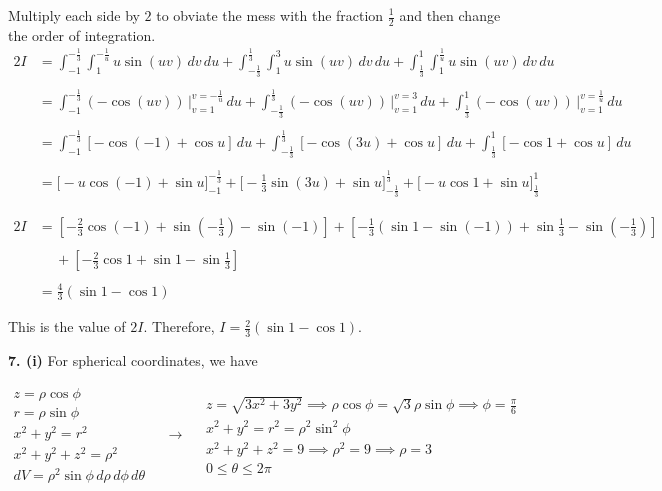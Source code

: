 \documentclass{article}
\begin{document}
Multiply each side by $2$ to obviate the mess with the fraction $\displaystyle\frac12$ and then change the order of integration.
\begin{align*}
2{I}&=\int_{-1}^{\textstyle-\frac13}\int_1^{\textstyle-\frac1u}u\sin(uv)\,dv\,du+\int_{\textstyle-\frac13}^{\textstyle\frac13}\int_1^3u\sin(uv)\,dv\,du+\int_{\textstyle\frac13}^1\int_1^{\textstyle\frac1u}u\sin(uv)\,dv\,du\\\\&=\int_{-1}^{\textstyle-\frac13}(-\cos(uv))\,\bigg|_{v=1}^{v=-\frac1u}\,du+\int_{\textstyle-\frac13}^{\textstyle\frac13}(-\cos(uv))\,\bigg|_{v=1}^{v=3}\,du+\int_{\textstyle\frac13}^1(-\cos(uv))\,\bigg|_{v=1}^{v=\frac1u}\,du\\\\&=\int_{-1}^{\textstyle-\frac13}[-\cos(-1)+\cos u]\,du+\int_{\textstyle-\frac13}^{\textstyle\frac13}[-\cos(3u)+\cos u]\,du+\int_{\textstyle\frac13}^1[-\cos1+\cos u]\,du\\\\&=\bigg[-u\cos(-1)+\sin u\bigg]_{-1}^{\textstyle-\frac13}+\bigg[-\frac13\sin(3u)+\sin u\bigg]_{\textstyle-\frac13}^{\textstyle\frac13}+\bigg[-u\cos1+\sin u\bigg]_{\textstyle\frac13}^1
\end{align*}

\begin{align*}
2{I}&=\left[-\frac23\cos(-1)+\sin\left(-\frac13\right)-\sin(-1)\right]+\left[-\frac13\left(\sin1-\sin(-1)\right)+\sin\frac13-\sin\left(-\frac13\right)\right]\\\\&\quad\:+\left[-\frac23\cos1+\sin1-\sin\frac13\right]\\\\&=\frac43(\sin1-\cos1)
\end{align*}

This is the value of $2{I}$. Therefore, $\boxed{{I}=\frac23(\sin1-\cos1)}$.

\vspace{1em}

\textbf{7. (i)} For spherical coordinates, we have

\[
\begin{array}{c}
z=\rho\cos\phi\\
r=\rho\sin\phi\\
x^2+y^2=r^2\\
x^2+y^2+z^2=\rho^2\\
dV=\rho^2\sin\phi\,d\rho\,d\phi\,d\theta
\end{array}\quad\rightarrow\quad
\begin{array}{c}
\displaystyle z=\sqrt{3x^2+3y^2}\implies\rho\cos\phi=\sqrt3\rho\sin\phi\implies\phi=\frac\pi6\\[0.2cm]
x^2+y^2=r^2=\rho^2\sin^2\phi\\[0.1cm]
x^2+y^2+z^2=9\implies\rho^2=9\implies\rho=3\\[0.1cm]
0\leq\theta\leq2\pi
\end{array}
\]
\end{document}
